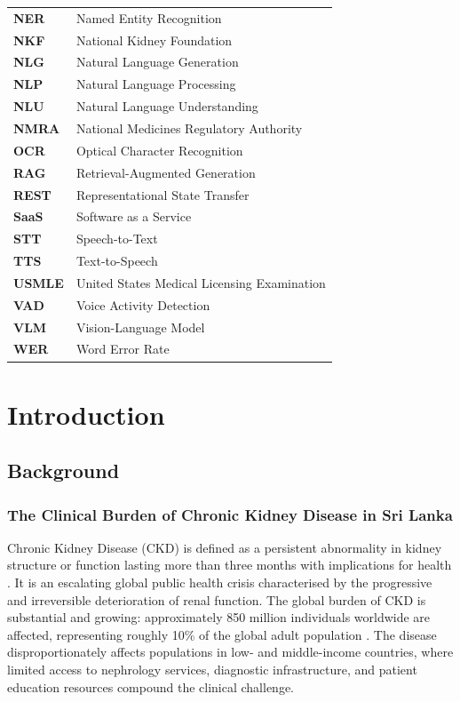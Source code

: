 \documentclass[12pt,a4paper]{report}
\begin{document}
\begin{tabular}{@{}lp{}@{}}
\textbf{NER}     & Named Entity Recognition \\
\textbf{NKF}     & National Kidney Foundation \\
\textbf{NLG}     & Natural Language Generation \\
\textbf{NLP}     & Natural Language Processing \\
\textbf{NLU}     & Natural Language Understanding \\
\textbf{NMRA}    & National Medicines Regulatory Authority \\
\textbf{OCR}     & Optical Character Recognition \\
\textbf{RAG}     & Retrieval-Augmented Generation \\
\textbf{REST}    & Representational State Transfer \\
\textbf{SaaS}    & Software as a Service \\
\textbf{STT}     & Speech-to-Text \\
\textbf{TTS}     & Text-to-Speech \\
\textbf{USMLE}   & United States Medical Licensing Examination \\
\textbf{VAD}     & Voice Activity Detection \\
\textbf{VLM}     & Vision-Language Model \\
\textbf{WER}     & Word Error Rate \\
\end{tabular}

\chapter{Introduction}
\label{chap:intro}

\section{Background}
\label{sec:background}

\subsection{The Clinical Burden of Chronic Kidney Disease in Sri Lanka}

Chronic Kidney Disease (CKD) is defined as a persistent abnormality in kidney structure or function lasting more than three months with implications for health \cite{KDIGO2024}. It is an escalating global public health crisis characterised by the progressive and irreversible deterioration of renal function. The global burden of CKD is substantial and growing: approximately 850 million individuals worldwide are affected, representing roughly 10\% of the global adult population \cite{Jager2019}. The disease disproportionately affects populations in low- and middle-income countries, where limited access to nephrology services, diagnostic infrastructure, and patient education resources compound the clinical challenge.
\end{document}
